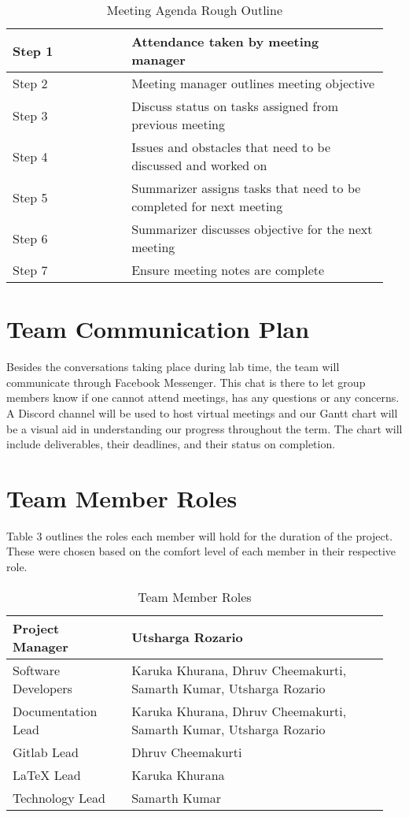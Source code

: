 \documentclass[12pt, titlepage]{article}
\begin{document}
\begin{table}[ht]
    \centering
    \begin{tabular}{| p{0.3\linewidth} | p{0.65\linewidth} |}
		\hline
Step 1 & Attendance taken by meeting manager\\ \hline
Step 2 & Meeting manager outlines meeting objective\\ \hline 
Step 3 & Discuss status on tasks assigned from previous meeting\\ \hline 
Step 4 & Issues and obstacles that need to be discussed and worked on\\ \hline
Step 5 & Summarizer assigns tasks that need to be completed for next meeting\\ \hline  
Step 6 & Summarizer discusses objective for the next meeting \\ \hline
Step 7 & Ensure meeting notes are complete\\ \hline
    \end{tabular}
    \caption{Meeting Agenda Rough Outline}
    \label{tab:my_label}
\end{table}

\newpage
\section{Team Communication Plan}
Besides the conversations taking place during lab time, the team will communicate through Facebook Messenger. This chat is there to let group members know if one cannot attend meetings, has any questions or any concerns. A Discord channel will be used to host virtual meetings and our Gantt chart will be a visual aid in understanding our progress throughout the term. The chart will include deliverables, their deadlines, and their status on completion. 

\section{Team Member Roles}
Table 3 outlines the roles each member will hold for the duration of the project. These were chosen based on the comfort level of each member in their respective role.  
\begin{table}[ht]
    \centering
    \begin{tabular}{| p{0.3\linewidth} | p{0.65\linewidth} |}
		\hline
Project Manager & Utsharga Rozario \\ \hline
Software Developers & Karuka Khurana, Dhruv Cheemakurti, Samarth Kumar, Utsharga Rozario \\ \hline
Documentation Lead & Karuka Khurana, Dhruv Cheemakurti, Samarth Kumar, Utsharga Rozario \\ \hline
Gitlab Lead & Dhruv Cheemakurti \\ \hline
LaTeX Lead & Karuka Khurana \\ \hline
Technology Lead & Samarth Kumar \\ \hline
    \end{tabular}
    \caption{Team Member Roles}
    \label{tab:my_label}
\end{table}
\end{document}
